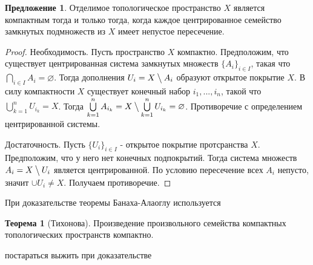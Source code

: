\documentclass[12pt]{extarticle}
\renewcommand{\setminus}{\mathbin{\big\backslash}}%
\theoremstyle{definition}
\newtheorem{theorem}{\indent Теорема}[section]
\newtheorem{suggestion}{\indent Предложение}[section]
\begin{document}
    \begin{suggestion}
    Отделимое топологическое пространство $X$ является компактным тогда и только тогда, когда каждое центрированное семейство замкнутых подмножеств из $X$ имеет непустое пересечение.
    \end{suggestion}
    \begin{proof}
    Необходимость. Пусть пространство $X$ компактно. Предположим, что существует центрированная система замкнутых множеств $\{A_i\}_{i \in I}$, такая что $\bigcap \limits_{i \in I} A_i = \varnothing$. Тогда дополнения $U_i = X\setminus A_i$ образуют открытое покрытие $X$. В силу компактности $X$ существует конечный набор $i_1, ..., i_n$, такой что $\bigcup \limits_{k=1}^{n} U_{i_k} = X$. Тогда $\bigcup \limits_{k=1}^{n} A_{i_k} = X\setminus \bigcup \limits_{k=1}^{n} U_{i_k} = \varnothing$. Противоречие с определением центрированной системы.
    
    Достаточность. Пусть $\{U_i\}_{i \in I}$ - открытое покрытие протсранства $X$. Предположим, что у него нет конечных подпокрытий. Тогда система множеств $A_i = X\setminus U_i$ является центрированной. По условию пересечение всех $A_i$ непусто, значит $\cup U_i \neq X$. Получаем противоречие.
    \end{proof}
    
    При доказательстве теоремы Банаха-Алаоглу используется
    
    \begin{theorem}[Тихонова]\label{th:Tikhonov}
    Произведение произвольного семейства компактных топологических пространств компактно.
    \end{theorem}
    
    постараться выжить при доказательстве
    
\end{document}
